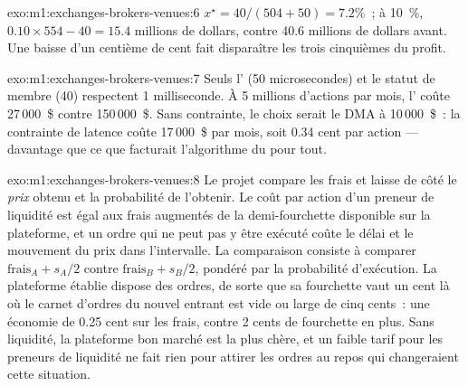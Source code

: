 \begin{solution}{exo:m1:exchanges-brokers-venues:6}
$x^\star = 40/(504+50) = 7.2\%$~; à 10~\%, $0.10 \times 554 - 40 = 15.4$
millions de dollars, contre 40.6 millions de dollars avant. Une baisse d'un centième de cent
fait disparaître les trois cinquièmes du profit.
\end{solution}

\begin{solution}{exo:m1:exchanges-brokers-venues:7}
Seuls l' (50 microsecondes) et le statut de membre (40) respectent 1
milliseconde. À 5 millions d'actions par mois, l' coûte 27\,000~\$
contre 150\,000~\$. Sans contrainte, le choix serait le DMA à 10\,000~\$~: la
contrainte de latence coûte 17\,000~\$ par mois, soit 0.34 cent par action --- davantage que
ce que facturait l'algorithme du  pour tout.
\end{solution}

\begin{solution}{exo:m1:exchanges-brokers-venues:8}
Le projet compare les frais et laisse de côté le \emph{prix} obtenu et la
probabilité de l'obtenir. Le coût par action d'un preneur de liquidité est égal aux frais augmentés de la
demi-fourchette disponible sur la plateforme, et un ordre qui ne peut pas y être exécuté
coûte le délai et le mouvement du prix dans l'intervalle. La comparaison consiste à
comparer $\text{frais}_A + s_A/2$ contre $\text{frais}_B + s_B/2$, pondéré par
la probabilité d'exécution. La plateforme établie dispose des ordres, de sorte que sa fourchette vaut un cent
là où le carnet d'ordres du nouvel entrant est vide ou large de cinq cents~: une économie de 0.25 cent
sur les frais, contre 2 cents de fourchette en plus. Sans liquidité, la plateforme bon marché est
la plus chère, et un faible tarif pour les preneurs de liquidité ne fait rien pour attirer les ordres au repos
qui changeraient cette situation.
\end{solution}

